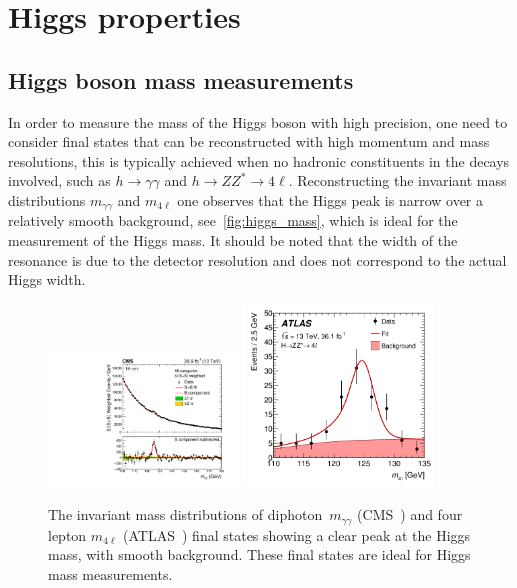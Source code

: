 \section{Higgs properties \label{sec:Higgsprop} }
\subsection{Higgs boson mass measurements}
In order to measure the mass of the Higgs boson with high precision, one need to consider final states that can be reconstructed with high momentum and mass resolutions, this is typically achieved when no hadronic constituents in the decays involved, such as  $ h \to \gamma \gamma$ and $ h \to Z Z^*\to 4 \ell$. Reconstructing the invariant mass distributions $m_{\gamma \gamma}$ and $m_{4\ell}$ one observes that the Higgs peak is narrow over a relatively smooth background, see~\autoref{fig:higgs_mass}, which is ideal for the measurement of the Higgs mass. It should be noted that the width of the resonance is due to the detector resolution and does not correspond to the actual Higgs width.\\
\begin{figure}[t!]
	\begin{center}
		\includegraphics[width=0.45\textwidth]{figures/Higgs_results/CMS-HIG-19-004_Figure_005-b}
		\includegraphics[width=0.45\textwidth]{figures/Higgs_results/dataAll_H4l_m4l_pdf_constrained} 
		\caption{The invariant mass distributions of diphoton~$m_{\gamma \gamma}$ (CMS~\cite{CMS:2020xrn}) and four lepton $m_{4 \ell}$ (ATLAS~\cite{ATLAS:2018tdk}) final states showing a clear peak at the Higgs mass, with smooth background. These final states are ideal for Higgs mass measurements. \label{fig:higgs_mass} }
	\end{center}
\end{figure}
